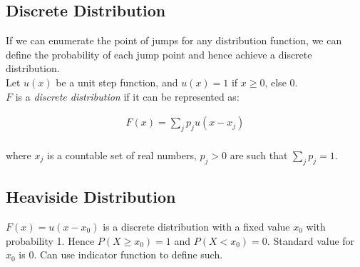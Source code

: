 \documentclass[11pt,a4paper,margin=1in]{article}
\begin{document}
\subsection{Discrete Distribution}
\begin{flushleft}
    If we can enumerate the point of jumps for any distribution function, we can
    define the probability of each jump point and hence achieve a discrete distribution.\\

    Let $u(x)$ be a unit step function, and $u(x) = 1$ if $x \geq 0$, else 0.\\
    $F$ is a \textit{discrete distribution} if it can be represented as: 
\end{flushleft}
\begin{gather*}
    F(x) = \sum_{j} p_j u(x - x_j) \\
\end{gather*}
\begin{flushleft}
    where ${x_j}$ is a countable set of real numbers, $p_j > 0$ are such that 
    $\sum_j p_j = 1$.
\end{flushleft}
\subsection{Heaviside Distribution}
\begin{flushleft}
    $F(x) = u(x - x_0)$ is a discrete distribution with a fixed value $x_0$ with
    probability 1. Hence $P(X \geq x_0) = 1$ and $P(X < x_0) = 0$. Standard value
    for $x_0$ is 0. Can use indicator function to define such.
\end{flushleft}
\end{document}
